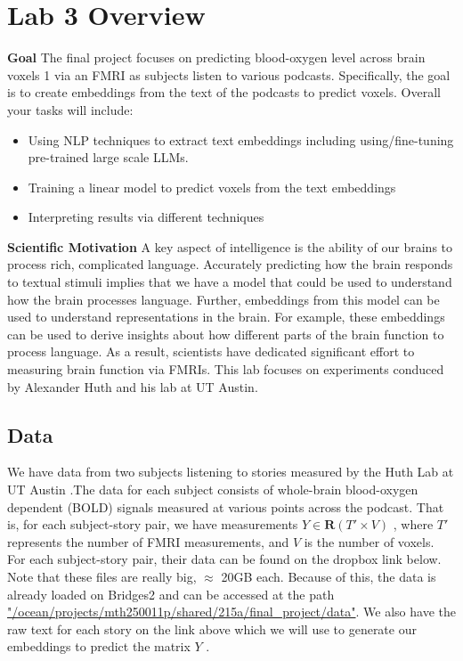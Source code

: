\documentclass[letterpaper,12pt]{article}
\begin{document}
\section{Lab 3 Overview}
\textbf{Goal} The final project focuses on predicting blood-oxygen level across brain voxels 1 via an FMRI as subjects listen to various podcasts. Specifically, the goal is to create embeddings from the text of the podcasts to predict voxels. Overall your tasks will include:

\begin{itemize}
\item Using NLP techniques to extract text embeddings including using/fine-tuning pre-trained large scale LLMs.
\item Training a linear model to predict voxels from the text embeddings
\item Interpreting results via different techniques
\end{itemize}

\textbf{Scientific Motivation} A key aspect of intelligence is the ability of our brains to process rich, complicated language. Accurately predicting how the brain responds to textual stimuli implies that we have a model that could be used to understand how the brain processes language. Further, embeddings from this model can be used to understand representations in the brain. For example, these embeddings can be used to derive insights about how different parts of the brain function to process language. As a result, scientists have dedicated significant effort to measuring brain function via FMRIs. This lab focuses on experiments conduced by Alexander Huth and his lab at UT Austin.\\

\clearpage

\subsection{Data}
We have data from two subjects listening to stories measured by the Huth Lab at UT Austin \cite{NEURIPS2018_f471223d}.The data for each subject consists of whole-brain blood-oxygen dependent (BOLD) signals measured at various points across the podcast. That is, for each subject-story pair, we have measurements $Y \in  \mathbf{R}(T'\times V)$ , where $T'$ represents the number of FMRI measurements, and $V$ is the number of voxels.
For each subject-story pair, their data can be found on the dropbox link below. Note that these files are really big, $\approx$ 20GB each. Because of this, the data is already loaded on Bridges2 and can be accessed at the path 
\url{"/ocean/projects/mth250011p/shared/215a/final_project/data"}. We also have the raw text for each story on the link above which we will use to generate our embeddings to predict the matrix $Y$ .\\
\end{document}
